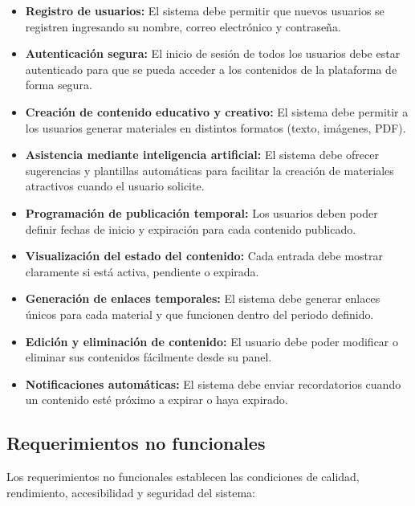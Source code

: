 \documentclass[12pt,a4paper]{report}
\begin{document}
\begin{itemize}
\item \textbf{Registro de usuarios:} El sistema debe permitir que nuevos usuarios se registren ingresando su nombre, correo electrónico y contraseña.

\item \textbf{Autenticación segura:} El inicio de sesión de todos los usuarios debe estar autenticado para que se pueda acceder a los contenidos de la plataforma de forma segura.

\item \textbf{Creación de contenido educativo y creativo:} El sistema debe permitir a los usuarios generar materiales en distintos formatos (texto, imágenes, PDF).

\item \textbf{Asistencia mediante inteligencia artificial:} El sistema debe ofrecer sugerencias y plantillas automáticas para facilitar la creación de materiales atractivos cuando el usuario solicite.

\item \textbf{Programación de publicación temporal:} Los usuarios deben poder definir fechas de inicio y expiración para cada contenido publicado.

\item \textbf{Visualización del estado del contenido:} Cada entrada debe mostrar claramente si está activa, pendiente o expirada.

\item \textbf{Generación de enlaces temporales:} El sistema debe generar enlaces únicos para cada material y que funcionen dentro del periodo definido.

\item \textbf{Edición y eliminación de contenido:} El usuario debe poder modificar o eliminar sus contenidos fácilmente desde su panel.

\item \textbf{Notificaciones automáticas:} El sistema debe enviar recordatorios cuando un contenido esté próximo a expirar o haya expirado.
\end{itemize}

\subsection{Requerimientos no funcionales}

Los requerimientos no funcionales establecen las condiciones de calidad, rendimiento, accesibilidad y seguridad del sistema:
\end{document}

